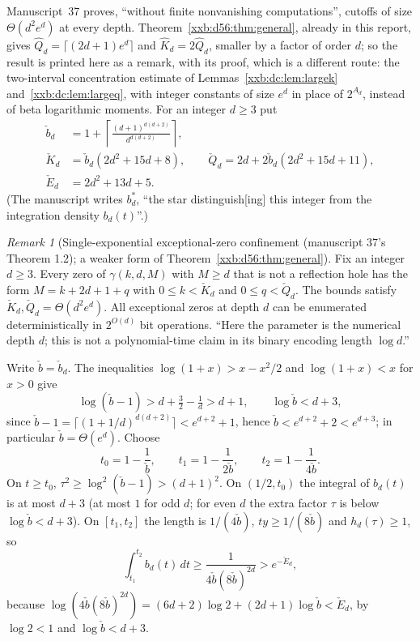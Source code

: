 \documentclass[11pt,a4paper]{article}
\numberwithin{equation}{section}
\theoremstyle{definition}
\theoremstyle{remark}
\newtheorem{remark}[theorem]{Remark}
\theoremstyle{plain}
\begin{document}
Manuscript~37 proves, ``without finite nonvanishing computations'', cutoffs of
size $\Theta(d^2e^d)$ at every depth.  Theorem~\ref{xxb:d56:thm:general},
already in this report, gives $\widehat Q_d=\lceil(2d+1)e^d\rceil$ and
$\widehat K_d=2\widehat Q_d$, smaller by a factor of order $d$; so the result is
printed here as a remark, with its proof, which is a different route: the
two-interval concentration estimate of Lemmas~\ref{xxb:dc:lem:largek}
and~\ref{xxb:dc:lem:largeq}, with integer constants of size $e^{d}$ in place of
$2^{A_d}$, instead of beta logarithmic moments.  For an integer $d\ge3$ put
\begin{align}
 \check b_d&=1+\left\lceil\frac{(d+1)^{d(d+2)}}{d^{d(d+2)}}\right\rceil,
 \label{xxb:d78:eq:bconstant}\\
 \check K_d&=\check b_d(2d^2+15d+8),\qquad
 \check Q_d=2d+2\check b_d(2d^2+15d+11),\label{xxb:d78:eq:KQ}\\
 \check E_d&=2d^2+13d+5.\label{xxb:d78:eq:Estar}
\end{align}
(The manuscript writes $b_d^*$, ``the star distinguish[ing] this integer from
the integration density $b_d(t)$''.)

\begin{remark}[Single-exponential exceptional-zero confinement (manuscript 37's Theorem 1.2); a weaker form of Theorem~\ref{xxb:d56:thm:general}]\label{xxb:d78:rem:universal}
Fix an integer $d\ge3$.  Every zero of $\gamma(k,d,M)$ with $M\ge d$ that is
not a reflection hole has the form $M=k+2d+1+q$ with $0\le k<\check K_d$ and
$0\le q<\check Q_d$.  The bounds satisfy $\check K_d,\check Q_d=\Theta(d^2e^d)$.
All exceptional zeros at depth $d$ can be enumerated deterministically in
$2^{O(d)}$ bit operations.  ``Here the parameter is the numerical depth $d$;
this is not a polynomial-time claim in its binary encoding length $\log d$.''
\end{remark}

Write $\check b=\check b_d$.  The inequalities $\log(1+x)>x-x^2/2$ and
$\log(1+x)<x$ for $x>0$ give
\begin{equation}\label{xxb:d78:eq:blogbounds}
 \log(\check b-1)>d+\tfrac32-\tfrac1d>d+1,\qquad \log\check b<d+3,
\end{equation}
since $\check b-1=\lceil(1+1/d)^{d(d+2)}\rceil<e^{d+2}+1$, hence
$\check b<e^{d+2}+2<e^{d+3}$; in particular $\check b=\Theta(e^d)$.  Choose
\[
 t_0=1-\frac1{\check b},\qquad t_1=1-\frac1{2\check b},\qquad t_2=1-\frac1{4\check b}.
\]
On $t\ge t_0$, $\tau^2\ge\log^2(\check b-1)>(d+1)^2$.  On $(1/2,t_0)$ the
integral of $b_d(t)$ is at most $d+3$ (at most $1$ for odd $d$; for even $d$
the extra factor $\tau$ is below $\log\check b<d+3$).  On $[t_1,t_2]$ the
length is $1/(4\check b)$, $ty\ge1/(8\check b)$ and $h_d(\tau)\ge1$, so
\begin{equation}\label{xxb:d78:eq:intervalmass}
 \int_{t_1}^{t_2}b_d(t)\,dt\ge\frac1{4\check b(8\check b)^{2d}}>e^{-\check E_d},
\end{equation}
because $\log(4\check b(8\check b)^{2d})=(6d+2)\log2+(2d+1)\log\check b<\check E_d$,
by $\log2<1$ and $\log\check b<d+3$.
\end{document}
